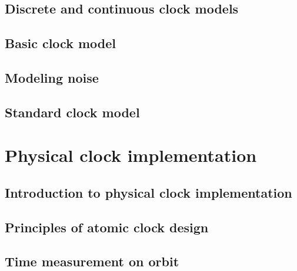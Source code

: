 \subsection{Discrete and continuous clock models}

\subsection{Basic clock model}

\subsection{Modeling noise}

\subsection{Standard clock model}




\section{Physical clock implementation}

\subsection{Introduction to physical clock implementation}

\subsection{Principles of atomic clock design}

\subsection{Time measurement on orbit}


